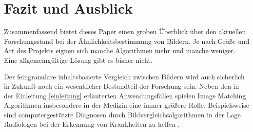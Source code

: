 \section{Fazit und Ausblick}\label{fazit-u-ausblick}
Zusammenfassend bietet dieses Paper einen groben Überblick über den aktuellen
Forschungsstand bei der Ähnlichkeitsbestimmung von Bildern. Je nach Größe und
Art des Projekts eignen sich manche Algorithmen mehr und manche weniger. Eine 
allgemeingültige Lösung gibt es bisher nicht.

Der feingranulare inhaltsbasierte Vergleich zwischen Bildern wird auch
sicherlich in Zukunft noch ein wesentlicher Bestandteil der Forschung sein.
Neben den in der Einleitung \ref{einleitung} erläuterten Anwendungsfällen
spielen Image Matching Algorithmen insbesondere in der Medizin eine immer
größere Rolle. Beispielsweise sind computergestützte Diagnosen durch 
Bildvergleichsalgorithmen in der Lage Radiologen bei der Erkennung von
Krankheiten zu helfen \parencite{conclusion-medical}.